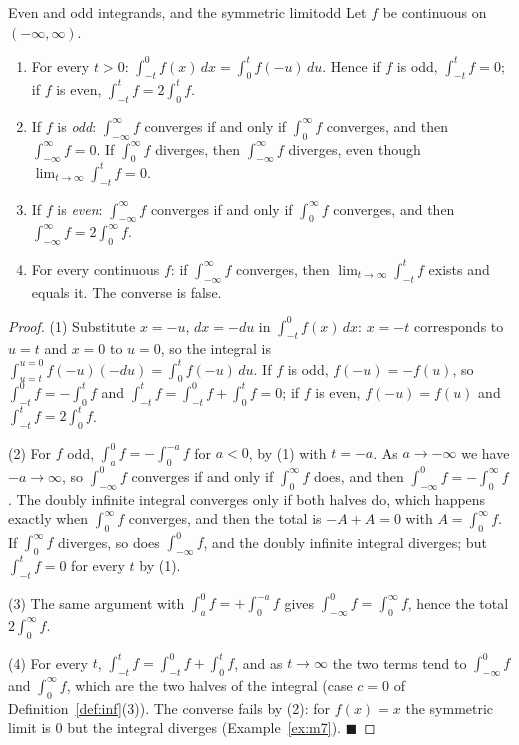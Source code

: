 \documentclass[11pt]{article}
\begin{document}
\begin{thm}{Even and odd integrands, and the symmetric limit}{odd}
Let $f$ be continuous on $(-\infty,\infty)$.
\begin{enumerate}[label=(\arabic*),leftmargin=*]
  \item For every $t>0$: $\int_{-t}^0f(x)\,dx=\int_0^tf(-u)\,du$. Hence if $f$ is odd, $\int_{-t}^tf=0$; if $f$ is even, $\int_{-t}^tf=2\int_0^tf$.
  \item If $f$ is \emph{odd}: $\int_{-\infty}^\infty f$ converges if and only if $\int_0^\infty f$ converges, and then $\int_{-\infty}^\infty f=0$. If $\int_0^\infty f$ diverges, then $\int_{-\infty}^\infty f$ diverges, even though $\lim_{t\to\infty}\int_{-t}^tf=0$.
  \item If $f$ is \emph{even}: $\int_{-\infty}^\infty f$ converges if and only if $\int_0^\infty f$ converges, and then $\int_{-\infty}^\infty f=2\int_0^\infty f$.
  \item For every continuous $f$: if $\int_{-\infty}^\infty f$ converges, then $\lim_{t\to\infty}\int_{-t}^tf$ exists and equals it. The converse is false.
\end{enumerate}
\end{thm}
\begin{proof}
(1) Substitute $x=-u$, $dx=-du$ in $\int_{-t}^0f(x)\,dx$: $x=-t$ corresponds to $u=t$ and $x=0$ to $u=0$, so the integral is $\int_{u=t}^{u=0}f(-u)(-du)=\int_0^tf(-u)\,du$. If $f$ is odd, $f(-u)=-f(u)$, so $\int_{-t}^0f=-\int_0^tf$ and $\int_{-t}^tf=\int_{-t}^0f+\int_0^tf=0$; if $f$ is even, $f(-u)=f(u)$ and $\int_{-t}^tf=2\int_0^tf$.

(2) For $f$ odd, $\int_a^0f=-\int_0^{-a}f$ for $a<0$, by (1) with $t=-a$. As $a\to-\infty$ we have $-a\to\infty$, so $\int_{-\infty}^0f$ converges if and only if $\int_0^\infty f$ does, and then $\int_{-\infty}^0f=-\int_0^\infty f$. The doubly infinite integral converges only if both halves do, which happens exactly when $\int_0^\infty f$ converges, and then the total is $-A+A=0$ with $A=\int_0^\infty f$. If $\int_0^\infty f$ diverges, so does $\int_{-\infty}^0f$, and the doubly infinite integral diverges; but $\int_{-t}^tf=0$ for every $t$ by (1).

(3) The same argument with $\int_a^0f=+\int_0^{-a}f$ gives $\int_{-\infty}^0f=\int_0^\infty f$, hence the total $2\int_0^\infty f$.

(4) For every $t$, $\int_{-t}^tf=\int_{-t}^0f+\int_0^tf$, and as $t\to\infty$ the two terms tend to $\int_{-\infty}^0f$ and $\int_0^\infty f$, which are the two halves of the integral (case $c=0$ of Definition~\ref{def:inf}(3)). The converse fails by (2): for $f(x)=x$ the symmetric limit is $0$ but the integral diverges (Example~\ref{ex:m7}). $\blacksquare$
\end{proof}
\end{document}
